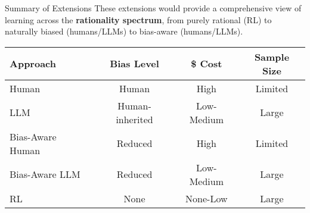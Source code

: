 \begin{frame}{Summary of Extensions}
These extensions would provide a comprehensive view of learning across the \textbf{rationality spectrum}, from purely rational (RL) to naturally biased (humans/LLMs) to bias-aware (humans/LLMs).

\bigskip
    \begin{center}
        \begin{tabular}{|l|c|c|c|}
            \hline
            \textbf{Approach} & \textbf{Bias Level} & \textbf{\$ Cost} & \textbf{Sample Size} \\
            \hline \hline
            \rowcolor{red!20}
            Human & Human & High & Limited \\
            \hline
            \rowcolor{red!20}
            LLM & Human-inherited & Low-Medium & Large \\
            \hline \hline 
            \rowcolor{orange!20}
            Bias-Aware Human & Reduced & High  & Limited \\
            \hline
            \rowcolor{orange!20}
			Bias-Aware LLM & Reduced & Low-Medium  & Large \\
			\hline \hline 
            \rowcolor{green!20}
            RL  & None & None-Low & Large \\
            \hline
        \end{tabular}
    \end{center}

\end{frame}

